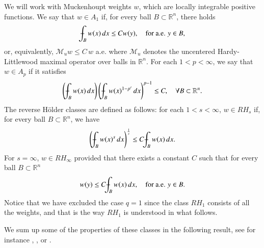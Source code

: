 \documentclass[11pt, a4paper,leqno]{amsart}
\def\Xint#1{\mathchoice
    {\XXint\displaystyle\textstyle{#1}}%
    {\XXint\textstyle\scriptstyle{#1}}%
    {\XXint\scriptstyle\scriptscriptstyle{#1}}%
    {\XXint\scriptscriptstyle\scriptscriptstyle{#1}}%
    \!\int}
\def\XXint#1#2#3{{\setbox0=\hbox{$#1{#2#3}{\int}$}
    \vcenter{\hbox{$#2#3$}}\kern-.5\wd0}}
\def\dashint{\Xint-}
\def\Xint#1{\mathchoice
    {\XXint\displaystyle\textstyle{#1}}%
    {\XXint\textstyle\scriptstyle{#1}}%
    {\XXint\scriptstyle\scriptscriptstyle{#1}}%
    {\XXint\scriptscriptstyle\scriptscriptstyle{#1}}%
    \!\int}
\def\XXint#1#2#3{{\setbox0=\hbox{$#1{#2#3}{\int}$}
    \vcenter{\hbox{$#2#3$}}\kern-.5\wd0}}
\theoremstyle{plain}
\theoremstyle{definition}
\theoremstyle{remark}
\numberwithin{equation}{section}
\def \R{ \mathbb{R} }
\begin{document}
We will work with Muckenhoupt weights $w$, which are locally integrable positive functions. We say that $w\in A_1$ if, for every ball $B\subset \mathbb{R}^n$, there holds
$$
\dashint_Bw(x) \, dx\leq C w(y), \quad \textrm{for a.e. } y\in B,
$$
or, equivalently, $\mathcal{M}_u w\le C\,w$  a.e. where $\mathcal{M}_u$ denotes the uncentered Hardy-Littlewood
 maximal operator over balls in $\R^n$.
For each $1<p<\infty$, we say that $w\in A_p$ if it satisfies
$$\left(\dashint_Bw(x) \, dx\right)\left(\dashint_Bw(x)^{1-p'} \, dx\right)^{p-1}
\leq C, \quad \forall B\subset \mathbb{R}^n.$$
The reverse H\"older classes are defined as follows: for each $1<s<\infty$,
$w\in RH_s$ if, for every ball $B\subset \mathbb{R}^n$, we have
$$\left(\dashint_Bw(x)^s \, dx\right)^{\frac{1}{s}}\leq C\dashint_Bw(x) \, dx.$$
For $s=\infty$, $w\in RH_{\infty}$ provided that there exists a constant $C$ such that for every ball $B\subset \mathbb{R}^n$
$$
w(y)\leq C\dashint_Bw(x) \, dx, \quad \textrm{for a.e. }y\in B.
$$
Notice that we have excluded the case $q = 1$ since the class $RH_1$ consists of all the
weights, and that is the way $RH_1$ is understood in what follows.


We sum up some of the properties of these classes in the following result, see for instance \cite{GCRF85},
\cite{Duo}, or \cite{Grafakos}. %
\end{document}

